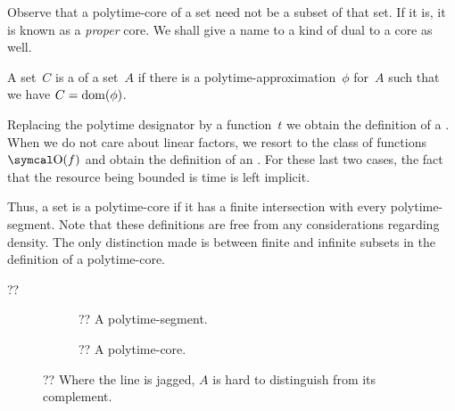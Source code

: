 Observe that a polytime-core of a set need not be a subset of that set.
If it is, it is known as a \emph{proper} core.
We shall give a name to a kind of dual to a core as well.
\begin{definition}
  A set~$C$ is a  of a set~$A$ if there is a polytime-approximation~$\phi$ for~$A$ such that we have $C = \operatorname{dom}(\phi)$.

  Replacing the polytime designator by a function~$t$ we obtain the definition of a .
  When we do not care about linear factors, we resort to the class of functions $\bigO(f)$ and obtain the definition of an .
  For these last two cases, the fact that the resource being bounded is time is left implicit.
\end{definition}
Thus, a set is a polytime-core if it has a finite intersection with every polytime-segment.
Note that these definitions are free from any considerations regarding density.
The only distinction made is between finite and infinite subsets in the definition of a polytime-core.

\begin{example}
  ??
  \begin{figure}
    \centering
    \begin{subfigure}{0.4\textwidth}
      \centering
      \caption{?? A polytime-segment.}
    \end{subfigure}
    \qquad
    \begin{subfigure}{0.4\textwidth}
      \centering
      \caption{?? A polytime-core.}
    \end{subfigure}
    \caption{?? Where the line is jagged, $A$ is hard to distinguish from its complement.}
    \label{fig:segmentcore}
  \end{figure}
\end{example}

